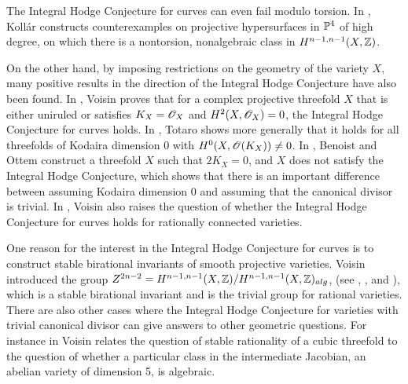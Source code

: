The Integral Hodge Conjecture for curves can even fail modulo torsion. In \cite{KollarTrento}, Koll\'ar constructs counterexamples on projective hypersurfaces in $\P^4$ of high degree, on which there is a nontorsion, nonalgebraic class in $H^{n-1,n-1}(X,\Z)$.

On the other hand, by imposing restrictions on the geometry of the variety $X$, many positive results in the direction of the Integral Hodge Conjecture have also been found. In \cite{Voi06}, Voisin proves that for a complex projective threefold $X$ that is either uniruled or satisfies $K_X = \sO_X$ and $H^2(X,\sO_X) = 0$, the Integral Hodge Conjecture for curves holds. In \cite{Tot19}, Totaro shows more generally that it holds for all threefolds of Kodaira dimension 0 with $H^0(X,\sO(K_X)) \neq 0$. In \cite{BO20}, Benoist and Ottem construct a threefold $X$ such that $2K_X = 0$, and $X$ does not satisfy the Integral Hodge Conjecture, which shows that there is an important difference between assuming Kodaira dimension 0 and assuming that the canonical divisor is trivial. In \cite{Voi06}, Voisin also raises the question of whether the Integral Hodge Conjecture for curves holds for rationally connected varieties.

One reason for the interest in the Integral Hodge Conjecture for curves is to construct stable birational invariants of smooth projective varieties. Voisin introduced the group $Z^{2n-2} = H^{n-1,n-1}(X,\Z)/H^{n-1,n-1}(X,\Z)_{alg}$, (see \cite{SouleVoisin}, \cite{Voi06}, \cite{ColliotTheleneVoisinIntegralHodge} and \cite{VoisinLueroth}), which is a stable birational invariant and is the trivial group for rational varieties. There are also other cases where the Integral Hodge Conjecture for varieties with trivial canonical divisor can give answers to other geometric questions. For instance in \cite{Voi17} Voisin relates the question of stable rationality of a cubic threefold to the question of whether a particular class in the intermediate Jacobian, an abelian variety of dimension 5, is algebraic.

